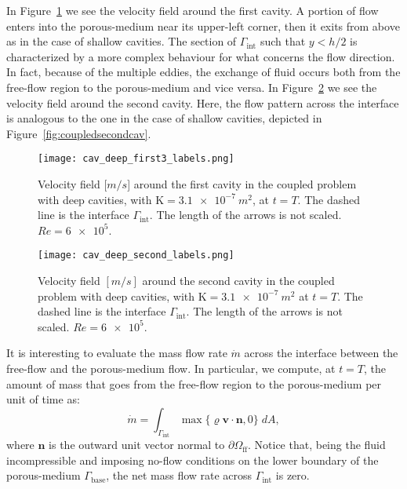 In Figure~\ref{fig:coupled_first_deep} we see the velocity field around the first cavity. A portion of flow enters into the porous-medium near its upper-left corner, then it exits from above as in the case of shallow cavities.
The section of $\Gamma_\text{int}$ such that $y<h/2$ is characterized by a more complex behaviour for what concerns the flow direction. In fact, because of the multiple eddies, the exchange of fluid occurs both from the free-flow region to the porous-medium and vice versa.
In Figure~\ref{fig:coupledsecondcav_deep} we see the velocity field around the second cavity. Here, the flow pattern across the interface is analogous to the one in the case of shallow cavities, depicted in Figure~\ref{fig:coupledsecondcav}.
\begin{figure}
	\centering
	\texttt{[image: cav\_deep\_first3\_labels.png]}
	\caption[Velocity field around the first cavity in the coupled problem with deep cavities]{Velocity field [$\si{m/s}$] around the first cavity in the coupled problem with deep cavities, with $\mathrm{K}=\SI{3.1e-7}{m^2}$, at $t=T$. The dashed line is the interface $\Gamma_\text{int}$. The length of the arrows is not scaled. $Re=\num{6e5}$.}
	\label{fig:coupled_first_deep}
\end{figure}
\begin{figure}
	\centering
	\texttt{[image: cav\_deep\_second\_labels.png]}
	\caption[Velocity field around the second cavity in the coupled problem with deep cavities]{Velocity field $[\si{m/s}]$ around the second cavity in the coupled problem with deep cavities, with $\mathrm{K}=\SI{3.1e-7}{m^2}$ at $t=T$. The dashed line is the interface $\Gamma_\text{int}$. The length of the arrows is not scaled. $Re=\num{6e5}$.}
	\label{fig:coupledsecondcav_deep}
\end{figure}

It is interesting to evaluate the mass flow rate $\dot{m}$ across the interface between the free-flow and the porous-medium flow. In particular, we compute, at $t=T$, the amount of mass that goes from the free-flow region to the porous-medium per unit of time as:
\begin{equation}
\dot{m} = \int_{\Gamma_\text{int}} \max \{\varrho \mathbf{v} \cdot \mathbf{n}, 0 \} \; dA,
\end{equation}
where $\mathbf{n}$ is the outward unit vector normal to $\partial \Omega_\text{ff}$. Notice that, being the fluid incompressible and imposing no-flow conditions on the lower boundary of the porous-medium $\Gamma_\text{base}$, the net mass flow rate across $\Gamma_\text{int}$ is zero.

